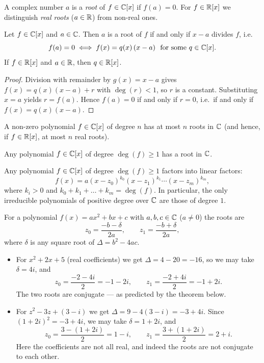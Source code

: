 A complex number $a$ is a \emph{root} of $f\in \mathbb{C}[x]$ if $f(a)=0$. For $f\in\mathbb{R}[x]$ we distinguish
\emph{real roots} ($a\in\mathbb{R}$) from non-real ones.

\begin{theorem}
Let $f\in\mathbb{C}[x]$ and $a\in\mathbb{C}$. Then $a$ is a root of $f$ if and only if $x-a$ divides $f$, i.e.\
\[
f(a) = 0 \iff f(x) = q(x)\,(x-a) \ \text{ for some } q\in\C[x].
\]
If $f\in\mathbb{R}[x]$ and $a\in\mathbb{R}$, then $q\in\mathbb{R}[x]$.
\end{theorem}

\begin{proof}
Division with remainder by $g(x)=x-a$ gives $f(x) = q(x)(x-a)+r$ with $\deg(r)<1$, so $r$ is a constant.
Substituting $x=a$ yields $r = f(a)$. Hence $f(a)=0$ if and only if $r = 0$, i.e.\ if and only if
$f(x)=q(x)(x-a)$.
\end{proof}

\begin{corollary}
A non-zero polynomial $f\in\mathbb{C}[x]$ of degree $n$ has at most $n$ roots in $\mathbb{C}$ (and hence, if $f\in\mathbb{R}[x]$,
at most $n$ real roots).
\end{corollary}

\begin{theorem}
Any polynomial $f\in \mathbb{C}[x]$ of degree $\deg(f)\geq 1$ has a root in $\mathbb{C}$.
\end{theorem}

\begin{corollary}
Any polynomial $f\in \mathbb{C}[x]$ of degree $\deg(f)\geq 1$ factors into linear factors:
\[
f(x) = a(x-z_0)^{k_0}(x-z_1)^{k_1}\cdots (x-z_m)^{k_m},
\]
where $k_i>0$ and $k_0+k_1+\ldots+k_m = \deg(f)$. In particular, the only irreducible polynomials of positive
degree over $\mathbb{C}$ are those of degree $1$.
\end{corollary}

\begin{theorem}
For a polynomial $f(x) = ax^2 + bx + c$ with $a,b,c\in \mathbb{C}$ ($a\neq 0$) the roots are
\[
z_0 = \frac{-b-\delta}{2a}, \qquad z_1 = \frac{-b+\delta}{2a},
\]
where $\delta$ is any square root of $\Delta = b^2-4ac$.
\end{theorem}

\begin{example}
\hfill
\begin{itemize}
\item For $x^2+2x+5$ (real coefficients) we get $\Delta = 4-20 = -16$, so we may take $\delta = 4i$, and
\[
z_0 = \frac{-2-4i}{2} = -1-2i, \qquad z_1 = \frac{-2+4i}{2} = -1+2i.
\]
The two roots are conjugate — as predicted by the theorem below.
\item For $z^2-3z+(3-i)$ we get $\Delta = 9-4(3-i) = -3+4i$. Since $(1+2i)^2 = -3+4i$, we may take
$\delta = 1+2i$, and
\[
z_0 = \frac{3-(1+2i)}{2} = 1-i, \qquad z_1 = \frac{3+(1+2i)}{2} = 2+i.
\]
Here the coefficients are not all real, and indeed the roots are not conjugate to each other.
\end{itemize}
\end{example}

